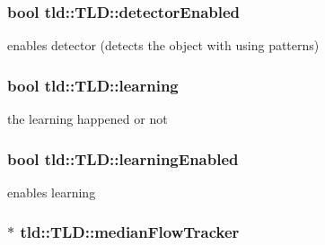 \hypertarget{classtld_1_1TLD_a925a0be8c0b83bcb8c2c91a046c7db1b}{
\subsubsection[{detector\-Enabled}]{\setlength{\rightskip}{0pt plus 5cm}bool tld\-::\-T\-L\-D\-::detector\-Enabled}}\label{classtld_1_1TLD_a925a0be8c0b83bcb8c2c91a046c7db1b}


enables detector (detects the object with using patterns) 

\hypertarget{classtld_1_1TLD_a0f108af012bc9b7d004bed33cf8e4d90}{
\subsubsection[{learning}]{\setlength{\rightskip}{0pt plus 5cm}bool tld\-::\-T\-L\-D\-::learning}}\label{classtld_1_1TLD_a0f108af012bc9b7d004bed33cf8e4d90}


the learning happened or not 

\hypertarget{classtld_1_1TLD_a86422799478881dd711d0a78444be245}{
\subsubsection[{learning\-Enabled}]{\setlength{\rightskip}{0pt plus 5cm}bool tld\-::\-T\-L\-D\-::learning\-Enabled}}\label{classtld_1_1TLD_a86422799478881dd711d0a78444be245}


enables learning 

\hypertarget{classtld_1_1TLD_a8b523afaefa5fbd9bc86fd656b87e1c0}{
\subsubsection[{median\-Flow\-Tracker}]{$\ast$ tld\-::\-T\-L\-D\-::median\-Flow\-Tracker}}\label{classtld_1_1TLD_a8b523afaefa5fbd9bc86fd656b87e1c0}


